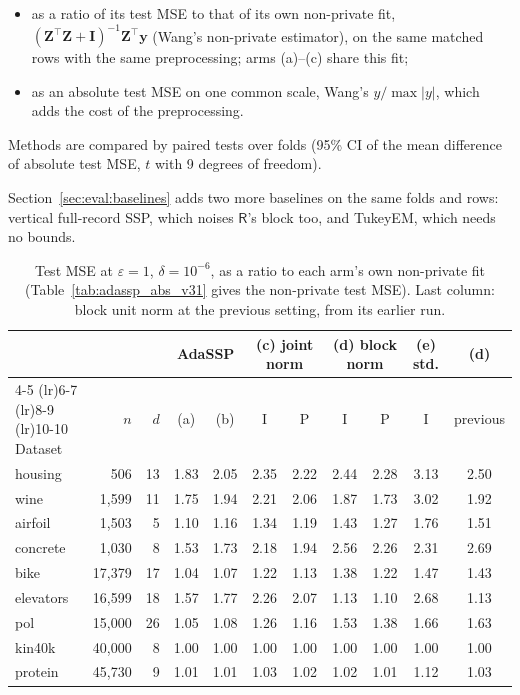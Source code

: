 \documentclass[11pt]{article}
\theoremstyle{definition}
\theoremstyle{plain}
\newcommand{\bZ}{\mathbf{Z}}
\newcommand{\by}{\mathbf{y}}
\newcommand{\bI}{\mathbf{I}}
\newcommand{\Party}[1]{\textsf{#1}}
\newcommand{\Rp}{\Party{R}}
\begin{document}
\begin{itemize}[noitemsep]
  \item as a ratio of its test MSE to that of its own non-private fit, $(\bZ^\top\bZ + \bI)^{-1}\bZ^\top\by$ (Wang's non-private estimator), on the same matched rows with the same preprocessing; arms (a)--(c) share this fit;
  \item as an absolute test MSE on one common scale, Wang's $y/\max|y|$, which adds the cost of the preprocessing.
\end{itemize}
Methods are compared by paired tests over folds (95\% CI of the mean difference of absolute test MSE, $t$ with 9 degrees of freedom).

Section~\ref{sec:eval:baselines} adds two more baselines on the same folds and rows: vertical full-record SSP, which noises $\Rp$'s block too, and TukeyEM, which needs no bounds.

\begin{table}[t]
  \centering
  \small
  \caption{Test MSE at $\varepsilon = 1$, $\delta = 10^{-6}$, as a ratio to each arm's own non-private fit (Table~\ref{tab:adassp_abs_v31} gives the non-private test MSE). Last column: block unit norm at the previous setting, from its earlier run.}
  \label{tab:adassp_v31}
  \setlength{\tabcolsep}{4pt}
  \begin{tabular}{@{}lrrcccccccc@{}}
    \toprule
    & & & \multicolumn{2}{c}{AdaSSP} & \multicolumn{2}{c}{(c) joint norm} & \multicolumn{2}{c}{(d) block norm} & (e) std. & (d) \\
    \cmidrule(lr){4-5} \cmidrule(lr){6-7} \cmidrule(lr){8-9} \cmidrule(lr){10-10}
    Dataset & $n$ & $d$ & (a) & (b) & I & P & I & P & I & previous \\
    \midrule
    housing & 506 & 13 & 1.83 & 2.05 & 2.35 & 2.22 & 2.44 & 2.28 & 3.13 & 2.50 \\
    wine & 1{,}599 & 11 & 1.75 & 1.94 & 2.21 & 2.06 & 1.87 & 1.73 & 3.02 & 1.92 \\
    airfoil & 1{,}503 & 5 & 1.10 & 1.16 & 1.34 & 1.19 & 1.43 & 1.27 & 1.76 & 1.51 \\
    concrete & 1{,}030 & 8 & 1.53 & 1.73 & 2.18 & 1.94 & 2.56 & 2.26 & 2.31 & 2.69 \\
    bike & 17{,}379 & 17 & 1.04 & 1.07 & 1.22 & 1.13 & 1.38 & 1.22 & 1.47 & 1.43 \\
    elevators & 16{,}599 & 18 & 1.57 & 1.77 & 2.26 & 2.07 & 1.13 & 1.10 & 2.68 & 1.13 \\
    pol & 15{,}000 & 26 & 1.05 & 1.08 & 1.26 & 1.16 & 1.53 & 1.38 & 1.66 & 1.63 \\
    kin40k & 40{,}000 & 8 & 1.00 & 1.00 & 1.00 & 1.00 & 1.00 & 1.00 & 1.00 & 1.00 \\
    protein & 45{,}730 & 9 & 1.01 & 1.01 & 1.03 & 1.02 & 1.02 & 1.01 & 1.12 & 1.03 \\
    \bottomrule
  \end{tabular}
\end{table}
\end{document}

